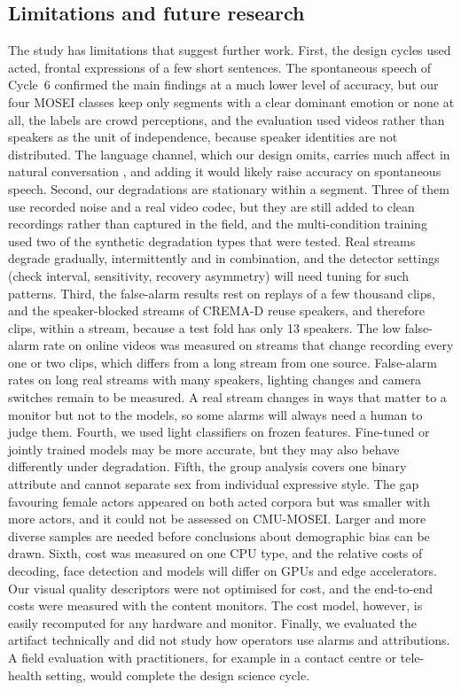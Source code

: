 \subsection{Limitations and future research}

The study has limitations that suggest further work. First, the design cycles used acted, frontal expressions of a few short sentences. The spontaneous speech of Cycle~6 confirmed the main findings at a much lower level of accuracy, but our four MOSEI classes keep only segments with a clear dominant emotion or none at all, the labels are crowd perceptions, and the evaluation used videos rather than speakers as the unit of independence, because speaker identities are not distributed. The language channel, which our design omits, carries much affect in natural conversation \citep{zadeh2018}, and adding it would likely raise accuracy on spontaneous speech. Second, our degradations are stationary within a segment. Three of them use recorded noise and a real video codec, but they are still added to clean recordings rather than captured in the field, and the multi-condition training used two of the synthetic degradation types that were tested. Real streams degrade gradually, intermittently and in combination, and the detector settings (check interval, sensitivity, recovery asymmetry) will need tuning for such patterns. Third, the false-alarm results rest on replays of a few thousand clips, and the speaker-blocked streams of CREMA-D reuse speakers, and therefore clips, within a stream, because a test fold has only 13 speakers. The low false-alarm rate on online videos was measured on streams that change recording every one or two clips, which differs from a long stream from one source. False-alarm rates on long real streams with many speakers, lighting changes and camera switches remain to be measured. A real stream changes in ways that matter to a monitor but not to the models, so some alarms will always need a human to judge them. Fourth, we used light classifiers on frozen features. Fine-tuned or jointly trained models may be more accurate, but they may also behave differently under degradation. Fifth, the group analysis covers one binary attribute and cannot separate sex from individual expressive style. The gap favouring female actors appeared on both acted corpora but was smaller with more actors, and it could not be assessed on CMU-MOSEI. Larger and more diverse samples are needed before conclusions about demographic bias can be drawn. Sixth, cost was measured on one CPU type, and the relative costs of decoding, face detection and models will differ on GPUs and edge accelerators. Our visual quality descriptors were not optimised for cost, and the end-to-end costs were measured with the content monitors. The cost model, however, is easily recomputed for any hardware and monitor. Finally, we evaluated the artifact technically and did not study how operators use alarms and attributions. A field evaluation with practitioners, for example in a contact centre or tele-health setting, would complete the design science cycle.
